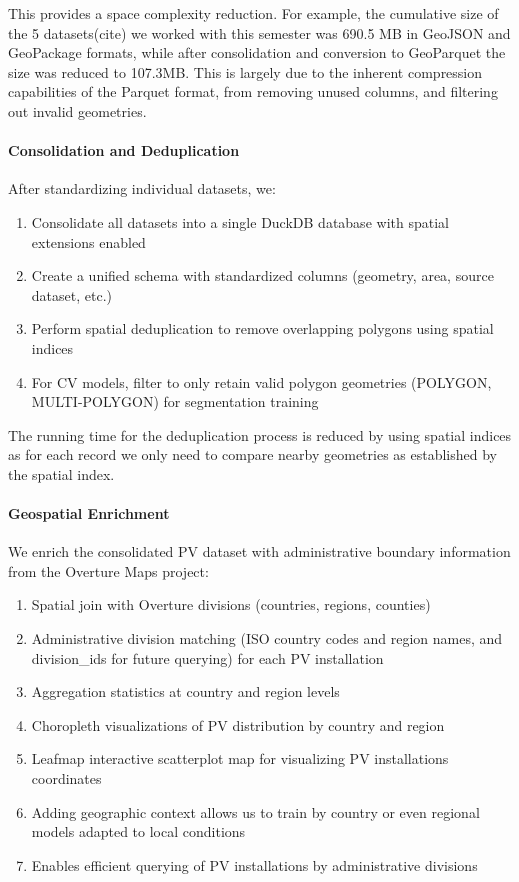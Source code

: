 \begin{multicols}{2}
This provides a space complexity reduction. For example, the cumulative size of the 5 datasets(cite) we worked with this semester was 690.5 MB in GeoJSON and GeoPackage formats, 
while after consolidation and conversion to GeoParquet the size was reduced to 107.3MB. This is largely due to the inherent compression capabilities of the Parquet format, from removing unused columns, 
and filtering out invalid geometries. 

\paragraph{Consolidation and Deduplication}
After standardizing individual datasets, we:
\begin{enumerate}
    \item Consolidate all datasets into a single DuckDB database with spatial extensions enabled
    \item Create a unified schema with standardized columns (geometry, area, source dataset, etc.)
    \item Perform spatial deduplication to remove overlapping polygons using spatial indices
    \item For CV models, filter to only retain valid polygon geometries (POLYGON, MULTI-POLYGON) for segmentation training
\end{enumerate}

The running time for the deduplication process is reduced by using spatial indices as for each record we only need to compare nearby geometries as established by the spatial index.


\paragraph{Geospatial Enrichment}
We enrich the consolidated PV dataset with administrative boundary information from the Overture Maps project:
\begin{enumerate}
    \item Spatial join with Overture divisions (countries, regions, counties)
    \item Administrative division matching (ISO country codes and region names, and division\_ids for future querying) for each PV installation
    \item Aggregation statistics at country and region levels
    \item Choropleth visualizations of PV distribution by country and region
    \item Leafmap interactive scatterplot map for visualizing PV installations coordinates
    \item Adding geographic context allows us to train by country or even regional models adapted to local conditions
    \item Enables efficient querying of PV installations by administrative divisions
\end{enumerate}


\end{multicols}
